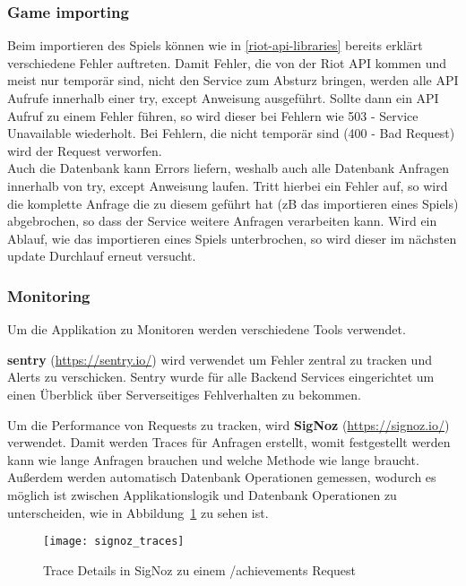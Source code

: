 \subsubsection{Game importing}
Beim importieren des Spiels können wie in \ref{riot-api-libraries} bereits erklärt verschiedene Fehler auftreten. Damit Fehler, die von der Riot API kommen und meist nur temporär sind, nicht den Service zum Absturz bringen, werden alle API Aufrufe innerhalb einer try, except Anweisung ausgeführt. Sollte dann ein API Aufruf zu einem Fehler führen, so wird dieser bei Fehlern wie 503 - Service Unavailable wiederholt. Bei Fehlern, die nicht temporär sind (400 - Bad Request) wird der Request verworfen.\\
Auch die Datenbank kann Errors liefern, weshalb auch alle Datenbank Anfragen innerhalb von try, except Anweisung laufen. Tritt hierbei ein Fehler auf, so wird die komplette Anfrage die zu diesem geführt hat (zB das importieren eines Spiels) abgebrochen, so dass der Service weitere Anfragen verarbeiten kann. Wird ein Ablauf, wie das importieren eines Spiels unterbrochen, so wird dieser im nächsten update Durchlauf erneut versucht.

\subsubsection{Monitoring}

Um die Applikation zu Monitoren werden verschiedene Tools verwendet.

\textbf{sentry} (\href{https://sentry.io/}{https://sentry.io/}) wird verwendet um Fehler zentral zu tracken und
Alerts zu verschicken.
Sentry wurde für alle Backend Services eingerichtet um einen Überblick über Serverseitiges Fehlverhalten zu bekommen.

Um die Performance von Requests zu tracken, wird \textbf{SigNoz} (\href{https://signoz.io/}{https://signoz.io/}) verwendet.
Damit werden Traces für Anfragen erstellt, womit festgestellt werden kann wie lange Anfragen brauchen und welche Methode wie lange braucht.
Außerdem werden automatisch Datenbank Operationen gemessen, wodurch es möglich ist zwischen Applikationslogik
und Datenbank Operationen zu unterscheiden, wie in Abbildung~\ref{fig:signoz-traces} zu sehen ist.
\begin{figure}
    \centering
    \texttt{[image: signoz\_traces]}
    \caption{Trace Details in SigNoz zu einem /achievements Request}
    \label{fig:signoz-traces}
\end{figure}